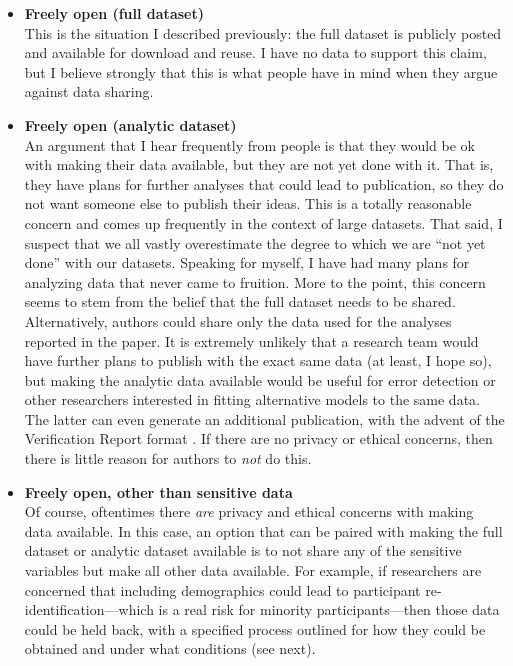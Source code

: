 \documentclass[authordate, empirical]{jote-new-article}
\begin{document}
\begin{itemize}
  \item \textbf{Freely open (full dataset)}\\
        This is the situation I described previously: the full dataset is publicly posted and available for download and reuse. I have no data to support this claim, but I believe strongly that this is what people have in mind when they argue against data sharing.

















  \item  \textbf{Freely open (analytic dataset)}\\
        An argument that I hear frequently from people is that they would be ok with making their data available, but they are not yet done with it. That is, they have plans for further analyses that could lead to publication, so they do not want someone else to publish their ideas. This is a totally reasonable concern and comes up frequently in the context of large datasets. That said, I suspect that we all vastly overestimate the degree to which we are “not yet done” with our datasets. Speaking for myself, I have had many plans for analyzing data that never came to fruition. More to the point, this concern seems to stem from the belief that the full dataset needs to be shared. Alternatively, authors could share only the data used for the analyses reported in the paper. It is extremely unlikely that a research team would have further plans to publish with the exact same data (at least, I hope so), but making the analytic data available would be useful for error detection or other researchers interested in fitting alternative models to the same data. The latter can even generate an additional publication, with the advent of the Verification Report format \parencites{Chambers2020}. If there are no privacy or ethical concerns, then there is little reason for authors to \emph{not} do this.







  \item \textbf{Freely open, other than sensitive data}\\
        Of course, oftentimes there \emph{are} privacy and ethical concerns with making data available. In this case, an option that can be paired with making the full dataset or analytic dataset available is to not share any of the sensitive variables but make all other data available. For example, if researchers are concerned that including demographics could lead to participant re-identification—which is a real risk for minority participants—then those data could be held back, with a specified process outlined for how they could be obtained and under what conditions (see next).








\end{itemize}
\end{document}
